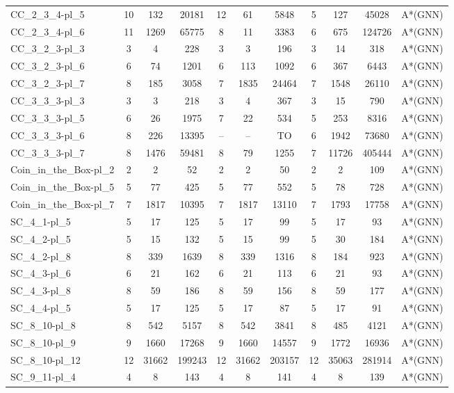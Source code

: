 \documentclass{article}
\newcommand{\unsolvedColumn}{--}
\newcommand{\myTO}{TO}
\begin{document}
\begin{longtable}[!ht]{l|ccc|ccc|cccc}
CC\_2\_3\_4-pl\_5 & 10 & 132 & 20181 & 12 & 61 & 5848 & 5 & 127 & 45028 & A*(GNN) \\
CC\_2\_3\_4-pl\_6 & 11 & 1269 & 65775 & 8 & 11 & 3383 & 6 & 675 & 124726 & A*(GNN) \\
CC\_3\_2\_3-pl\_3 & 3 & 4 & 228 & 3 & 3 & 196 & 3 & 14 & 318 & A*(GNN) \\
CC\_3\_2\_3-pl\_6 & 6 & 74 & 1201 & 6 & 113 & 1092 & 6 & 367 & 6443 & A*(GNN) \\
CC\_3\_2\_3-pl\_7 & 8 & 185 & 3058 & 7 & 1835 & 24464 & 7 & 1548 & 26110 & A*(GNN) \\
CC\_3\_3\_3-pl\_3 & 3 & 3 & 218 & 3 & 4 & 367 & 3 & 15 & 790 & A*(GNN) \\
CC\_3\_3\_3-pl\_5 & 6 & 26 & 1975 & 7 & 22 & 534 & 5 & 253 & 8316 & A*(GNN) \\
CC\_3\_3\_3-pl\_6 & 8 & 226 & 13395 & \unsolvedColumn & \unsolvedColumn & \myTO & 6 & 1942 & 73680 & A*(GNN) \\
CC\_3\_3\_3-pl\_7 & 8 & 1476 & 59481 & 8 & 79 & 1255 & 7 & 11726 & 405444 & A*(GNN) \\
Coin\_in\_the\_Box-pl\_2 & 2 & 2 & 52 & 2 & 2 & 50 & 2 & 2 & 109 & A*(GNN) \\
Coin\_in\_the\_Box-pl\_5 & 5 & 77 & 425 & 5 & 77 & 552 & 5 & 78 & 728 & A*(GNN) \\
Coin\_in\_the\_Box-pl\_7 & 7 & 1817 & 10395 & 7 & 1817 & 13110 & 7 & 1793 & 17758 & A*(GNN) \\
SC\_4\_1-pl\_5 & 5 & 17 & 125 & 5 & 17 & 99 & 5 & 17 & 93 & A*(GNN) \\
SC\_4\_2-pl\_5 & 5 & 15 & 132 & 5 & 15 & 99 & 5 & 30 & 184 & A*(GNN) \\
SC\_4\_2-pl\_8 & 8 & 339 & 1639 & 8 & 339 & 1316 & 8 & 184 & 923 & A*(GNN) \\
SC\_4\_3-pl\_6 & 6 & 21 & 162 & 6 & 21 & 113 & 6 & 21 & 93 & A*(GNN) \\
SC\_4\_3-pl\_8 & 8 & 59 & 186 & 8 & 59 & 156 & 8 & 59 & 177 & A*(GNN) \\
SC\_4\_4-pl\_5 & 5 & 17 & 125 & 5 & 17 & 87 & 5 & 17 & 91 & A*(GNN) \\
SC\_8\_10-pl\_8 & 8 & 542 & 5157 & 8 & 542 & 3841 & 8 & 485 & 4121 & A*(GNN) \\
SC\_8\_10-pl\_9 & 9 & 1660 & 17268 & 9 & 1660 & 14557 & 9 & 1772 & 16936 & A*(GNN) \\
SC\_8\_10-pl\_12 & 12 & 31662 & 199243 & 12 & 31662 & 203157 & 12 & 35063 & 281914 & A*(GNN) \\
SC\_9\_11-pl\_4 & 4 & 8 & 143 & 4 & 8 & 141 & 4 & 8 & 139 & A*(GNN) \\

\end{longtable}
\end{document}
